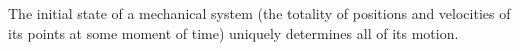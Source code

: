 The initial state of a mechanical system (the totality of positions and velocities of its points at some moment of time) uniquely determines all of its motion.
